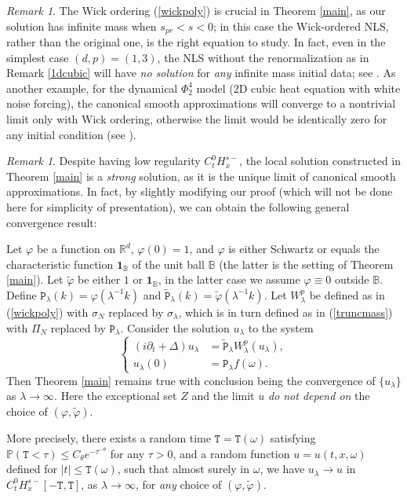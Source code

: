 \documentclass[11 pt,reqno]{amsart}
\theoremstyle{definition}
\theoremstyle{remark}
\newtheorem{rem}[thm]{Remark}
\numberwithin{equation}{section}
\newcommand{\Rb}{\mathbb{R}}
\newcommand{\Pb}{\mathbb{P}}
\begin{document}
 \begin{rem}\label{needwick} The Wick ordering (\ref{wickpoly}) is crucial in Theorem \ref{main}, as our solution has infinite mass when $s_{pr}<s<0$; in this case the Wick-ordered NLS, rather than the original one, is the right equation to study. In fact, even in the simplest case $(d,p)=(1,3)$, the NLS without the renormalization as in Remark \ref{1dcubic} will have \emph{no solution} for \emph{any} infinite mass initial data; see \cite{GO}. As another example, for the dynamical $\Phi_2^4$ model (2D cubic heat equation with white noise forcing), the canonical smooth approximations will converge to a nontrivial limit only with Wick ordering, otherwise the limit would be identically zero for any initial condition (see \cite{ChW,HR+}).
\end{rem}
\begin{rem}\label{strongrem} Despite having low regularity $C_t^0H_x^{s-}$, the local solution constructed in Theorem \ref{main} is a \emph{strong} solution, as it is the unique limit of canonical smooth approximations. In fact, by slightly modifying our proof (which will not be done here for simplicity of presentation), we can obtain the following general convergence result:

Let $\varphi$ be a function on $\Rb^d$, $\varphi(0)=1$, and $\varphi$ is either Schwartz or equals the characteristic function $\mathbf{1}_{\mathbb{B}}$ of the unit ball $\mathbb{B}$ (the latter is the setting of Theorem \ref{main}). Let $\widetilde{\varphi}$ be either $1$ or $\mathbf{1}_{\mathbb{B}}$, in the latter case we assume $\varphi\equiv 0$ outside $\mathbb{B}$. Define $\mathtt{P}_\lambda(k)=\varphi(\lambda^{-1}k)$ and $\widetilde{\mathtt{P}}_\lambda(k)=\widetilde{\varphi}(\lambda^{-1}k)$. Let $W_{\lambda}^p$ be defined as in (\ref{wickpoly}) with $\sigma_N$ replaced by $\sigma_{\lambda}$, which is in turn defined as in (\ref{truncmass}) with $\Pi_N$ replaced by $\mathtt{P}_\lambda$. Consider the solution $u_{\lambda}$ to the system
\begin{equation}\label{nlstruncgen}
\left\{
\begin{aligned}(i\partial_t+\Delta)u_{\lambda}&=\widetilde{\mathtt{P}}_\lambda W_{\lambda}^{p}(u_{\lambda}),\\
u_{\lambda}(0)&=\mathtt{P}_\lambda f(\omega).
\end{aligned}
\right.
\end{equation}Then Theorem \ref{main} remains true with conclusion being the convergence of $\{u_{\lambda}\}$ as $\lambda\to\infty$. Here the exceptional set $Z$ and the limit $u$ \emph{do not depend on} the choice of $(\varphi,\widetilde{\varphi})$.

More precisely, there exists a random time $\mathtt{T}=\mathtt{T}(\omega)$ satisfying $\Pb(\mathtt{T}<\tau)\leq C_\theta e^{-\tau^{-\theta}}$ for any $\tau>0$, and a random function $u=u(t,x,\omega)$ defined for $|t|\leq \mathtt{T}(\omega)$, such that almost surely in $\omega$, we have $u_{\lambda}\to u$ in $C_t^0H_x^{s-}[-\mathtt{T},\mathtt{T}]$, as $\lambda\to\infty$, for \emph{any} choice of $(\varphi,\widetilde{\varphi})$.
 \end{rem}
\end{document}
